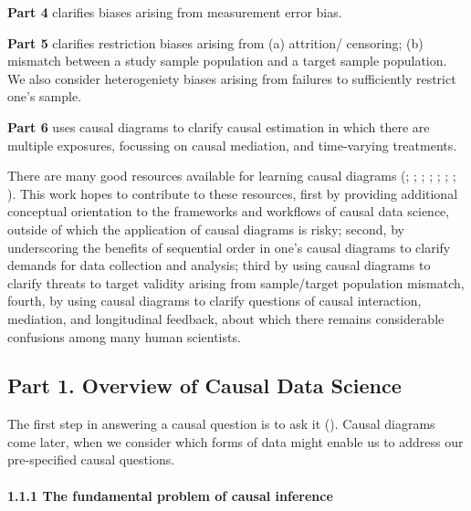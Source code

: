 \documentclass[
  singlecolumn]{article}
\let\oldparagraph\paragraph
\renewcommand{\paragraph}[1]{\oldparagraph{#1}\mbox{}}
\begin{document}
\textbf{Part 4} clarifies biases arising from measurement error bias.

\textbf{Part 5} clarifies restriction biases arising from (a) attrition/
censoring; (b) mismatch between a study sample population and a target
sample population. We also consider heterogeniety biases arising from
failures to sufficiently restrict one's sample.

\textbf{Part 6} uses causal diagrams to clarify causal estimation in
which there are multiple exposures, focussing on causal mediation, and
time-varying treatments.

There are many good resources available for learning causal diagrams
(;
;
;
;
;
; ; ). This work
hopes to contribute to these resources, first by providing additional
conceptual orientation to the frameworks and workflows of causal data
science, outside of which the application of causal diagrams is risky;
second, by underscoring the benefits of sequential order in one's causal
diagrams to clarify demands for data collection and analysis; third by
using causal diagrams to clarify threats to target validity arising from
sample/target population mismatch, fourth, by using causal diagrams to
clarify questions of causal interaction, mediation, and longitudinal
feedback, about which there remains considerable confusions among many
human scientists.

\subsection{Part 1. Overview of Causal Data
Science}\label{part-1.-overview-of-causal-data-science}

The first step in answering a causal question is to ask it
(). Causal
diagrams come later, when we consider which forms of data might enable
us to address our pre-specified causal questions.

\paragraph{1.1.1 The fundamental problem of causal
inference}\label{the-fundamental-problem-of-causal-inference}
\end{document}
